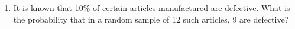 \begin{enumerate}[label=\thechapter.\arabic*,ref=\thechapter.\theenumi]
\item It is known that 10\% of certain articles manufactured are defective. What is the probability that in a random sample of 12 such articles, 9 are defective?
\end{enumerate}
